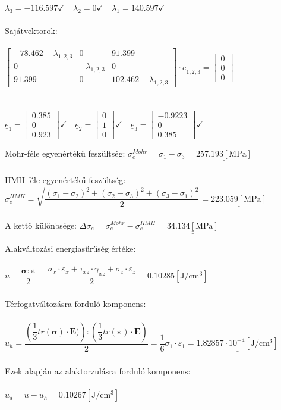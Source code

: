 \documentclass[10pt, a4paper]{article}
\newcommand{\hatodik}{\begin{trivlist}\item[\hskip \labelsep {\bfseries 
			{6. Feladat:}}]\end{trivlist}}
\newcommand{\het}{\begin{trivlist}\item[\hskip \labelsep {\bfseries 
			{7. Feladat:}}]\end{trivlist}}
\newcommand{\mpa}{\mathrm{\left[MPa\right]}}
\newcommand{\jpcm}{\mathrm{\left[J/cm^3\right]}}
\begin{document}
	$\lambda_3 = -116.597\checkmark \quad \lambda_2 = 0\checkmark \quad \lambda_1 = 140.597\checkmark$\\\\
	Sajátvektorok:\\\\
	$\begin{bmatrix}
		-78.462-\lambda_{1,2,3} & 0 & 91.399\\
		0 & -\lambda_{1,2,3} & 0\\
		91.399 & 0 & 102.462-\lambda_{1,2,3}
	\end{bmatrix} \cdot \underline{e}_{1,2,3} = \begin{bmatrix}
	0\\
	0\\ 
	0 
	\end{bmatrix}$\\\\\\
	$\underline{e}_1 = \begin{bmatrix}0.385 \\ 0 \\ 0.923\end{bmatrix}\checkmark \quad \underline{e}_2 = \begin{bmatrix}0 \\ 1 \\ 0\end{bmatrix}\checkmark \quad \underline{e}_3 = \begin{bmatrix}-0.9223 \\ 0 \\ 0.385\end{bmatrix}\checkmark$
	\hatodik
	Mohr-féle egyenértékű feszültség: $\sigma_e^{Mohr} = \sigma_1 - \sigma_3 = \underline{\underline{257.193 \mpa}}$\\\\
	HMH-féle egyenértékű feszültség: $\sigma_e^{HMH} = \sqrt{\dfrac{(\sigma_1 - \sigma_2)^2 + (\sigma_2 - \sigma_3)^2 + (\sigma_3 - \sigma_1)^2}{2}} = \underline{\underline{223.059 \mpa}}$\\\\
	A kettő különbsége: $\Delta\sigma_e = \sigma_e^{Mohr} - \sigma_e^{HMH} = \underline{\underline{34.134 \mpa}}$
	\het
	Alakváltozási energiasűrűség értéke:\\\\
	$u = \dfrac{\boldsymbol{\sigma} : \boldsymbol{\varepsilon}}{2} = \dfrac{\sigma_x \cdot \varepsilon_x + \tau_{xz} \cdot \gamma_{xz} + \sigma_z \cdot \varepsilon_z}{2} = \underline{\underline{0.10285 \jpcm}}$\\\\
	Térfogatváltozásra forduló komponens:\\\\
	$u_h =  \dfrac{\left(\dfrac{1}{3}tr(\boldsymbol{\sigma}) \cdot \textbf{E})\right) : \left(\dfrac{1}{3}tr(\boldsymbol{\varepsilon}) \cdot \textbf{E}\right)}{2}= \dfrac{1}{6}\sigma_1 \cdot \varepsilon_1 = \underline{\underline{1.82857 \cdot 10^{-4} \jpcm}}$\\\\
	Ezek alapján az alaktorzulásra forduló komponens:\\\\
	$u_d = u - u_h = \underline{\underline{0.10267 \jpcm}}$
\end{document}
